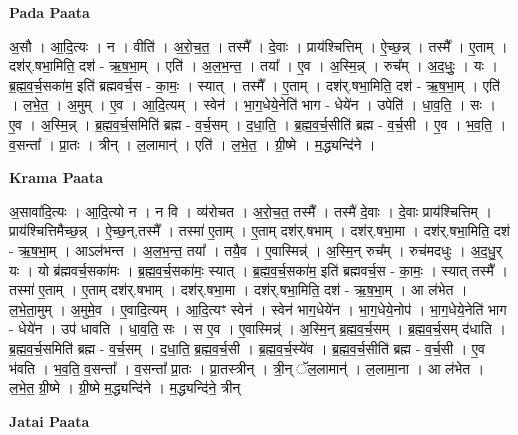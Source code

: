 \documentclass[17pt]{extarticle}
\begin{document}
\textbf{Pada Paata} \newline

अ॒सौ । आ॒दि॒त्यः । न । वीति॑ । अ॒रो॒च॒त॒ । तस्मै᳚ । दे॒वाः । प्राय॑श्चित्तिम् । ऐ॒च्छ॒न्न् । तस्मै᳚ । ए॒ताम् । दश॑र्.षभा॒मिति॒ दश॑ - ऋ॒ष॒भा॒म् । एति॑ । अ॒ल॒भ॒न्त॒ । तया᳚ । ए॒व । अ॒स्मि॒न्न् । रुच᳚म् । अ॒द॒धुः॒ । यः । ब्र॒ह्म॒व॒र्च॒सका॑म॒ इति॑ ब्रह्मवर्च॒स - का॒मः॒ । स्यात् । तस्मै᳚ । ए॒ताम् । दश॑र्.षभा॒मिति॒ दश॑ - ऋ॒ष॒भा॒म् । एति॑ । ल॒भे॒त॒ । अ॒मुम् । ए॒व । आ॒दि॒त्यम् । स्वेन॑ । भा॒ग॒धेये॒नेति॑ भाग - धेये॑न । उपेति॑ । धा॒व॒ति॒ । सः । ए॒व । अ॒स्मि॒न्न् । ब्र॒ह्म॒व॒र्च॒समिति॑ ब्रह्म - व॒र्च॒सम् । द॒धा॒ति॒ । ब्र॒ह्म॒व॒र्च॒सीति॑ ब्रह्म - व॒र्च॒सी । ए॒व । भ॒व॒ति॒ । व॒सन्ता᳚ । प्रा॒तः । त्रीन् । ल॒लामान्॑ । एति॑ । ल॒भे॒त॒ । ग्री॒ष्मे । म॒द्ध्यन्दि॑ने ।  \newline


\textbf{Krama Paata} \newline

अ॒सावा॑दि॒त्यः । आ॒दि॒त्यो न । न वि । व्य॑रोचत । अ॒रो॒च॒त॒ तस्मै᳚ । तस्मै॑ दे॒वाः । दे॒वाः प्राय॑श्चित्तिम् । प्राय॑श्चित्तिमैच्छ॒न्न् । ऐ॒च्छ॒न्,तस्मै᳚ । तस्मा॑ ए॒ताम् । ए॒ताम् दश॑र्.षभाम् । दश॑र्.षभा॒मा । दश॑र्.षभा॒मिति॒ दश॑ - ऋ॒ष॒भा॒॒म् । आऽल॑भन्त । अ॒ल॒भ॒न्त॒ तया᳚ । तयै॒व । ए॒वास्मिन्न्॑ । अ॒स्मि॒न् रुच᳚म् । रुच॑मदधुः । अ॒द॒धु॒र् यः । यो ब्र॑ह्मवर्च॒सका॑मः । ब्र॒ह्म॒व॒र्च॒सका॑मः॒ स्यात् । ब्र॒ह्म॒व॒र्च॒सका॑म॒ इति॑ ब्रह्मवर्च॒स - का॒मः॒ । स्यात् तस्मै᳚ । तस्मा॑ ए॒ताम् । ए॒ताम् दश॑र्.षभाम् । दश॑र्.षभा॒मा । दश॑र्.षभा॒मिति॒ दश॑ - ऋ॒ष॒भा॒॒म् । आ ल॑भेत । ल॒भे॒ता॒मुम् । अ॒मुमे॒व । ए॒वादि॒त्यम् । आ॒दि॒त्यꣳ स्वेन॑ । स्वेन॑ भाग॒धेये॑न । भा॒ग॒धेये॒नोप॑ । भा॒ग॒धेये॒नेति॑ भाग - धेये॑न । उप॑ धावति । धा॒व॒ति॒ सः । स ए॒व । ए॒वास्मिन्न्॑ । अ॒स्मि॒न् ब्र॒ह्म॒व॒र्च॒सम् । ब्र॒ह्म॒व॒र्च॒सम् द॑धाति । ब्र॒ह्म॒व॒र्च॒समिति॑ ब्रह्म - व॒र्च॒सम् । द॒धा॒ति॒ ब्र॒ह्म॒व॒र्च॒सी । ब्र॒ह्म॒व॒र्च॒स्ये॑व । ब्र॒ह्म॒व॒र्च॒सीति॑ ब्रह्म - व॒र्च॒सी । ए॒व भ॑वति । भ॒व॒ति॒ व॒सन्ता᳚ । व॒सन्ता᳚ प्रा॒तः । प्रा॒तस्त्रीन् । त्री॒न् ॅल॒लामान्॑ । ल॒लामा॒ना । आ ल॑भेत । ल॒भे॒त॒ ग्री॒ष्मे । ग्री॒ष्मे म॒द्ध्यन्दि॑ने । म॒द्ध्यन्दि॑ने॒ त्रीन् \newline

\textbf{Jatai Paata} \newline
\end{document}
